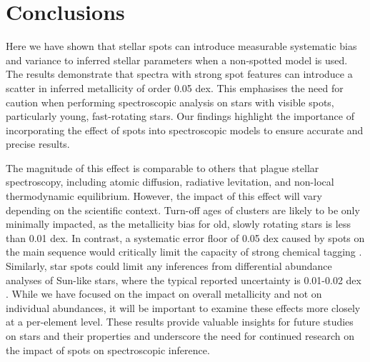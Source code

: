 

\section{Conclusions}
\label{sec:conclusions}

Here we have shown that stellar spots can introduce measurable systematic bias and variance to inferred stellar parameters when a non-spotted model is used. The results demonstrate that spectra with strong spot features can introduce a scatter in inferred metallicity of order 0.05 dex. This emphasises the need for caution when performing spectroscopic analysis on stars with visible spots, particularly young, fast-rotating stars. Our findings highlight the importance of incorporating the effect of spots into spectroscopic models to ensure accurate and precise results. 

The magnitude of this effect is comparable to others that plague stellar spectroscopy, including atomic diffusion, radiative levitation, and non-local thermodynamic equilibrium. However, the impact of this effect will vary depending on the scientific context. Turn-off ages of clusters are likely to be only minimally impacted, as the metallicity bias for old, slowly rotating stars is less than 0.01 dex. In contrast, a systematic error floor of 0.05 dex caused by spots on the main sequence would critically limit the capacity of strong chemical tagging \citep{casamiquela_impossibility_2021}. Similarly, star spots could limit any inferences from differential abundance analyses of Sun-like stars, where the typical reported uncertainty is 0.01-0.02 dex \citep[e.g.,][]{nissen_high-precision_2015}. While we have focused on the impact on overall metallicity and not on individual abundances, it will be important to examine these effects more closely at a per-element level. These results provide valuable insights for future studies on stars and their properties and underscore the need for continued research on the impact of spots on spectroscopic inference. 
